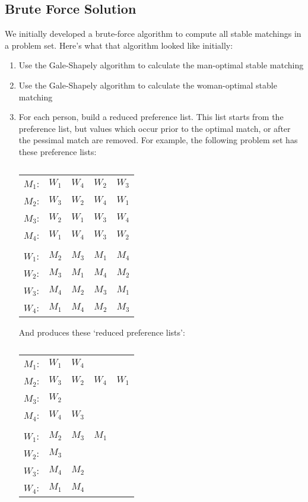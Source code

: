 \documentclass[a4paper]{article}
\begin{document}
\subsection{Brute Force Solution}
We initially developed a brute-force algorithm to compute all stable matchings in a problem set. Here's what that algorithm looked like initially:
\begin{enumerate}
    \item Use the Gale-Shapely algorithm to calculate the man-optimal stable matching
    
    \item Use the Gale-Shapely algorithm to calculate the woman-optimal stable matching
    
    \item For each person, build a reduced preference list. This list starts from the preference list, but values which occur prior to the optimal match, or after the pessimal match are removed. For example, the following problem set has these preference lists:


\begin{table}[H]
\centering
\caption{}
\begin{tabular}{lllll}
$M_1$: & $W_1$ & $W_4$ & $W_2$ & $W_3$ \\
$M_2$: & $W_3$ & $W_2$ & $W_4$ & $W_1$ \\
$M_3$: & $W_2$ & $W_1$ & $W_3$ & $W_4$ \\
$M_4$: & $W_1$ & $W_4$ & $W_3$ & $W_2$ \\
\\
$W_1$: & $M_2$ & $M_3$ & $M_1$ & $M_4$ \\
$W_2$: & $M_3$ & $M_1$ & $M_4$ & $M_2$ \\
$W_3$: & $M_4$ & $M_2$ & $M_3$ & $M_1$ \\
$W_4$: & $M_1$ & $M_4$ & $M_2$ & $M_3$ \\
\end{tabular}
\end{table}

And produces these `reduced preference lists':
\begin{table}[H]
\centering
\caption{}
\begin{tabular}{lllll}
$M_1$: & $W_1$ & $W_4$ & &       \\
$M_2$: & $W_3$ & $W_2$ & $W_4$ & $W_1$ \\
$M_3$: & $W_2$ & & &          \\
$M_4$: & $W_4$ & $W_3$ & &       \\
                        \\
$W_1$: & $M_2$ & $M_3$ & $M_1$ &    \\
$W_2$: & $M_3$ & & &          \\
$W_3$: & $M_4$ & $M_2$ & &       \\
$W_4$: & $M_1$ & $M_4$ & &       \\
\end{tabular}
\end{table}


\end{enumerate}
\end{document}
